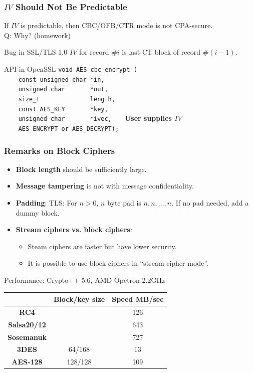 \begin{frame}[fragile]\frametitle{$IV$ Should Not Be Predictable}
If $IV$ is predictable, then CBC/OFB/CTR mode is not CPA-secure.\\
\alert{Q: Why? (homework)}
\begin{exampleblock}{Bug in SSL/TLS 1.0}
$IV$ for record $\#i$ is last CT block of record $\#(i-1)$.
\end{exampleblock}
\begin{exampleblock}{API in OpenSSL}
\verb#void AES_cbc_encrypt (# \\
\verb#    const unsigned char *in,# \\
\verb#    unsigned char       *out,# \\
\verb#    size_t              length,# \\
\verb#    const AES_KEY       *key,# \\
\verb#    unsigned char       *ivec,   #  \alert{\textbf{User supplies $IV$}} \\
\verb#    AES_ENCRYPT or AES_DECRYPT);# \\
\end{exampleblock}
\end{frame}
\begin{frame}\frametitle{Remarks on Block Ciphers}
\begin{itemize}
\item \textbf{Block length} should be sufficiently large.
\item \textbf{Message tampering} is not with message confidentiality.
\item \textbf{Padding}: TLS: For $n>0$, $n$ byte pad is $n,n,\dots,n$.
If no pad needed, add a dummy block.
\item \textbf{Stream ciphers vs. block ciphers}: 
\begin{itemize}
\item Steam ciphers are faster but have lower security.
\item It is possible to use block ciphers in ``stream-cipher mode''. 
\end{itemize}
\end{itemize}
\begin{exampleblock}{Performance: Crypto++ 5.6, AMD Opetron 2.2GHz}
\begin{center}
\begin{tabular}{|c|c|c|} \hline
                      & \textbf{Block/key size} & \textbf{Speed MB/sec} \\ \hline
\textbf{RC4}          &         & 126 \\  
\textbf{Salsa20/12}   &         & 643 \\ 
\textbf{Sosemanuk}    &         & 727 \\ 
\textbf{3DES}	      & 64/168  & 13  \\
\textbf{AES-128}      & 128/128 & 109 \\ \hline 
\end{tabular}	
\end{center}
\end{exampleblock}
\end{frame}

